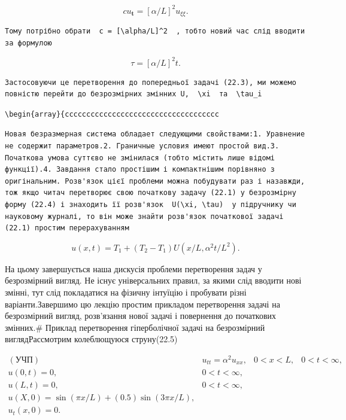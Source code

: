 \documentclass[
  ukrainian,
]{article}
\begin{document}
\[
cu_{\mathbf{t}} = [\alpha/L]^2 u_{\xi\xi}.
\]

\begin{verbatim}
Тому потрібно обрати  c = [\alpha/L]^2  , тобто новий час слід вводити за формулою
\end{verbatim}

\[
\tau = [\alpha/L]^2 t.
\]

\begin{verbatim}
Застосовуючи це перетворення до попередньої задачі (22.3), ми можемо повністю перейти до безрозмірних змінних U,  \xi  та  \tau_i
\end{verbatim}

\begin{verbatim}
\begin{array}{cccccccccccccccccccccccccccccccccccc
\end{verbatim}

\begin{verbatim}
Новая безразмерная система обладает следующими свойствами:1. Уравнение не содержит параметров.2. Граничные условия имеют простой вид.3. Початкова умова суттєво не змінилася (тобто містить лише відомі функції).4. Завдання стало простішим і компактнішим порівняно з оригінальним. Розв'язок цієї проблеми можна побудувати раз і назавжди, тож якщо читач перетворює свою початкову задачу (22.1) у безрозмірну форму (22.4) і знаходить її розв'язок  U(\xi, \tau)  у підручнику чи науковому журналі, то він може знайти розв'язок початкової задачі (22.1) простим перерахуванням
\end{verbatim}

\[
u(x, t) = T_1 + (T_2 - T_1) U(x/L, \alpha^2 t/L^2).
\]

На цьому завершується наша дискусія проблеми перетворення задач у
безрозмірний вигляд. Не існує універсальних правил, за якими слід
вводити нові змінні, тут слід покладатися на фізичну інтуїцію і
пробувати різні варіанти.Завершимо цю лекцію простим прикладом
перетворення задачі на безрозмірний вигляд, розв'язання нової задачі і
повернення до початкових змінних.\# Приклад перетворення гіперболічної
задачі на безрозмірний виглядРассмотрим колеблющуюся струну(22.5)

\[
\begin{array}{ll} (\text{УЧП}) & u_{tt} = \alpha^2 u_{xx}, & 0 < x < L, & 0 < t < \infty, \\ u(0, t) = 0, & 0 < t < \infty, \\ u(L, t) = 0, & 0 < t < \infty, \\ u(X, 0) = \sin(\pi x/L) + (0.5)\sin(3\pi x/L), \\ u_t(x, 0) = 0. & \end{array}
\]
\end{document}
